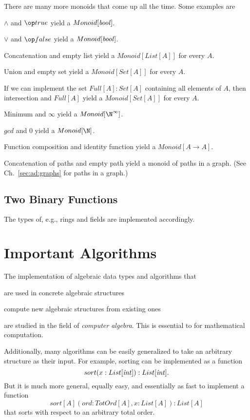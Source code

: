 There are many more monoids that come up all the time.
Some examples are
\begin{compactitem}
 \item $\wedge$ and $\true$ yield a $Monoid[\mathit{bool}]$.
 \item $\vee$ and $\false$ yield a $Monoid[\mathit{bool}]$.
 \item Concatenation and empty list yield a $Monoid[List[A]]$ for every $A$.
 \item Union and empty set yield a $Monoid[Set[A]]$ for every $A$.
 \item If we can implement the set $Full[A]:Set[A]$ containing all elements of $A$, then intersection and $Full[A]$ yield a $Monoid[Set[A]]$ for every $A$.
 \item Minimum and $\infty$ yield a $Monoid[\N^\infty]$.
 \item $gcd$ and $0$ yield a $Monoid[\N]$.
 \item Function composition and identity function yield a $Monoid[A\to A]$.
 \item Concatenation of paths and empty path yield a monoid of paths in a graph. (See Ch.~\ref{sec:ad:graphs} for paths in a graph.)
\end{compactitem}

\subsection{Two Binary Functions}

The types of, e.g., rings and fields are implemented accordingly.

\section{Important Algorithms}

The implementation of algebraic data types and algorithms that
\begin{compactitem}
 \item are used in concrete algebraic structures
 \item compute new algebraic structures from existing ones
\end{compactitem}
are studied in the field of \emph{computer algebra}.
This is essential to for mathematical computation.
\medskip

Additionally, many algorithms can be easily generalized to take an arbitrary structure as their input.
For example, sorting can be implemented as a function \[sort(x:List[\mathit{int}]):List[\mathit{int}].\]
But it is much more general, equally easy, and essentially as fast to implement a function \[sort[A](ord: TotOrd[A], x:List[A]):List[A]\] that sorts with respect to an arbitrary total order.

